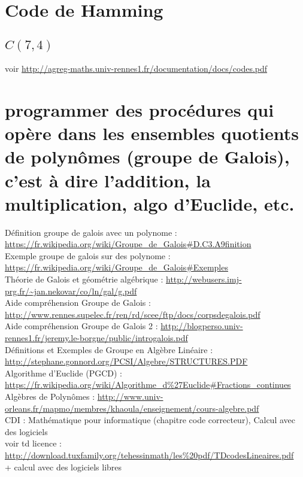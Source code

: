 \documentclass[a4paper,10pt]{report}
\begin{document}
	\section{Code de Hamming}
		\subsection{$C(7,4)$}
		\lstset{language=C}
		

voir \url{http://agreg-maths.univ-rennes1.fr/documentation/docs/codes.pdf} \\


\section{programmer des procédures qui opère dans les ensembles quotients de polynômes (groupe de Galois), c'est à dire l'addition, la multiplication, algo d'Euclide, etc.}

Définition groupe de galois avec un polynome : \url{https://fr.wikipedia.org/wiki/Groupe_de_Galois#D.C3.A9finition} \\
Exemple groupe de galois sur des polynome : \url{https://fr.wikipedia.org/wiki/Groupe_de_Galois#Exemples} \\

Théorie de Galois et géométrie algébrique : \url{http://webusers.imj-prg.fr/~jan.nekovar/co/ln/gal/g.pdf} \\

Aide compréhension Groupe de Galois : \url{http://www.rennes.supelec.fr/ren/rd/scee/ftp/docs/corpsdegalois.pdf} \\
Aide compréhension Groupe de Galois 2 : \url{http://blogperso.univ-rennes1.fr/jeremy.le-borgne/public/introgalois.pdf} \\

Définitions et Exemples de Groupe en Algèbre Linéaire : \url{http://stephane.gonnord.org/PCSI/Algebre/STRUCTURES.PDF} \\

Algorithme d'Euclide (PGCD) : \url{https://fr.wikipedia.org/wiki/Algorithme_d%27Euclide#Fractions_continues} \\

Algèbres de Polynômes : \url{http://www.univ-orleans.fr/mapmo/membres/khaoula/enseignement/cours-algebre.pdf} \\

CDI : Mathématique pour informatique (chapitre code correcteur), Calcul avec des logiciels  \\
voir td licence : \url{http://download.tuxfamily.org/tehessinmath/les%20pdf/TDcodesLineaires.pdf} \\
+ calcul avec des logiciels libres \\
\end{document}
